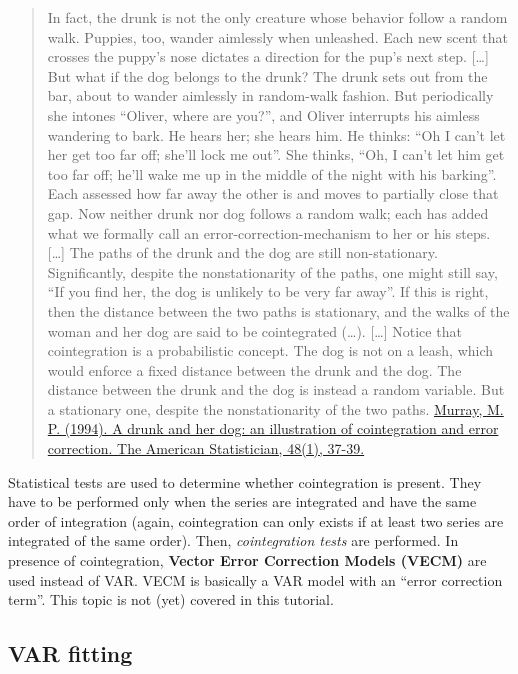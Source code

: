 \documentclass[
]{article}
\begin{document}
\begin{quote}
In fact, the drunk is not the only creature whose behavior follow a random walk. Puppies, too, wander aimlessly when unleashed. Each new scent that crosses the puppy's nose dictates a direction for the pup's next step. {[}\ldots{]} But what if the dog belongs to the drunk? The drunk sets out from the bar, about to wander aimlessly in random-walk fashion. But periodically she intones ``Oliver, where are you?'', and Oliver interrupts his aimless wandering to bark. He hears her; she hears him. He thinks: ``Oh I can't let her get too far off; she'll lock me out''. She thinks, ``Oh, I can't let him get too far off; he'll wake me up in the middle of the night with his barking''. Each assessed how far away the other is and moves to partially close that gap. Now neither drunk nor dog follows a random walk; each has added what we formally call an error-correction-mechanism to her or his steps. {[}\ldots{]} The paths of the drunk and the dog are still non-stationary. Significantly, despite the nonstationarity of the paths, one might still say, ``If you find her, the dog is unlikely to be very far away''. If this is right, then the distance between the two paths is stationary, and the walks of the woman and her dog are said to be cointegrated (\ldots). {[}\ldots{]} Notice that cointegration is a probabilistic concept. The dog is not on a leash, which would enforce a fixed distance between the drunk and the dog. The distance between the drunk and the dog is instead a random variable. But a stationary one, despite the nonstationarity of the two paths. \href{http://www-stat.wharton.upenn.edu/~steele/Courses/434F2005/Context/Co-integration/Murray93DrunkAndDog.pdf}{Murray, M. P. (1994). A drunk and her dog: an illustration of cointegration and error correction. The American Statistician, 48(1), 37-39.}
\end{quote}

Statistical tests are used to determine whether cointegration is present. They have to be performed only when the series are integrated and have the same order of integration (again, cointegration can only exists if at least two series are integrated of the same order). Then, \emph{cointegration tests} are performed. In presence of cointegration, \textbf{Vector Error Correction Models (VECM)} are used instead of VAR. VECM is basically a VAR model with an ``error correction term''. This topic is not (yet) covered in this tutorial.

\subsection{VAR fitting}\label{var-fitting}
\end{document}
